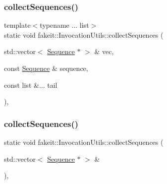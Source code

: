 \subsubsection{\texorpdfstring{collectSequences()}{collectSequences()}\hspace{0.1cm}{\footnotesize\ttfamily [16/18]}}
{\footnotesize\ttfamily template$<$typename ... list$>$ \\
static void fakeit\+::\+Invocation\+Utils\+::collect\+Sequences (\begin{DoxyParamCaption}\item[{std\+::vector$<$ \mbox{\hyperlink{classfakeit_1_1Sequence}{Sequence}} $\ast$ $>$ \&}]{vec,  }\item[{const \mbox{\hyperlink{classfakeit_1_1Sequence}{Sequence}} \&}]{sequence,  }\item[{const list \&...}]{tail }\end{DoxyParamCaption})\hspace{0.3cm}{\ttfamily [inline]}, {\ttfamily [static]}}

\mbox{\label{structfakeit_1_1InvocationUtils_ac2d11afbe797cdd0978cf42a25c4c1a6}} 
\subsubsection{\texorpdfstring{collectSequences()}{collectSequences()}\hspace{0.1cm}{\footnotesize\ttfamily [17/18]}}
{\footnotesize\ttfamily static void fakeit\+::\+Invocation\+Utils\+::collect\+Sequences (\begin{DoxyParamCaption}\item[{std\+::vector$<$ \mbox{\hyperlink{classfakeit_1_1Sequence}{Sequence}} $\ast$ $>$ \&}]{ }\end{DoxyParamCaption})\hspace{0.3cm}{\ttfamily [inline]}, {\ttfamily [static]}}

\mbox{\label{structfakeit_1_1InvocationUtils_a43b674a2f1109acf4c870e8fb9c2571d}} 
